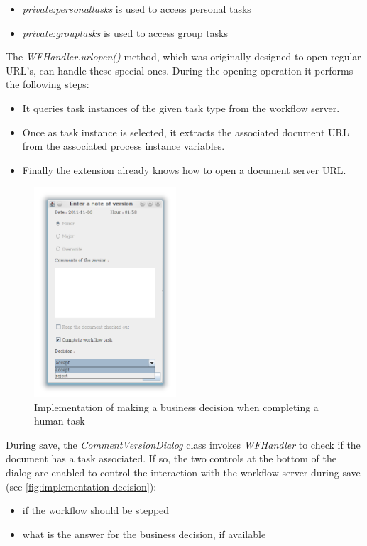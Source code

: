 \begin{itemize}
\item \emph{private:personaltasks} is used to access personal tasks
\item \emph{private:grouptasks} is used to access group tasks
\end{itemize}

The \emph{WFHandler.urlopen()} method, which was originally designed to open
regular URL's, can handle these special ones. During the opening operation it performs the following steps:

\begin{itemize}
\item It queries task instances of the given task type from the workflow server.
\item Once as task instance is selected, it extracts the associated document URL from the associated process instance variables.
\item Finally the extension already knows how to open a document server URL.
\end{itemize}

\begin{figure}[H]
\centering
\includegraphics[width=200px,keepaspectratio]{implementation-decision.png}
\caption{Implementation of making a business decision when completing a human task}
\label{fig:implementation-decision}
\end{figure}

During save, the \emph{CommentVersionDialog} class invokes \emph{WFHandler} to
check if the document has a task associated. If so, the two controls at the
bottom of the dialog are enabled to control the interaction with the workflow
server during save (see \autoref{fig:implementation-decision}):

\begin{itemize}
\item if the workflow should be stepped
\item what is the answer for the business decision, if available
\end{itemize}

